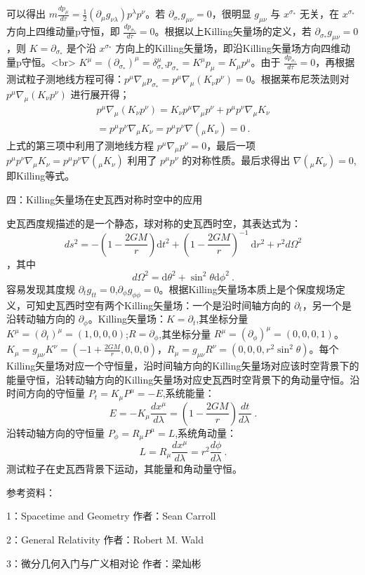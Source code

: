 可以得出 $m\frac{d p_{\mu}}{d \tau}=\frac{1}{2}\left(\partial_{\mu} g_{\nu \lambda}\right) p^{\lambda} p^{\nu}$。若 $\partial_{\sigma_{*}} g_{\mu \nu}=0$，很明显 $g_{\mu \nu}$ 与 $x^{\sigma_{*}}$ 无关，在 $x^{\sigma_{*}}$ 方向上四维动量p守恒，即 $\frac{d p_{\sigma_{*}}}{d \tau}=0$。根据以上Killing矢量场的定义，若 $\partial_{\sigma_{*}} g_{\mu \nu}=0$，则 $K=\partial_{\sigma_{*}}$ 是个沿 $x^{\sigma_{*}}$ 方向上的Killing矢量场，即沿Killing矢量场方向四维动量p守恒。<br>
$K^{\mu}=(\partial_{\sigma_{*}})^{\mu}=\delta_{\sigma_{*}}^{\mu}$,$p_{\sigma_{*}}=K^{\mu}p_{\mu}=K_{\mu}p^{\mu}$。由于 $\frac{d p_{\sigma_{*}}}{d \tau}=0$，再根据测试粒子测地线方程可得：$p^{\mu} \nabla_{\mu} p_{\sigma_{*}}=p^{\mu} \nabla_{\mu}(K_{\nu}p^{\nu}) =0$。根据莱布尼茨法则对 $p^{\mu} \nabla_{\mu}(K_{\nu}p^{\nu})$ 进行展开得；
$$\begin{aligned}
p^{\mu} \nabla_{\mu}(K_{\nu}p^{\nu})=K_{\nu}p^{\mu} \nabla_{\mu}p^{\nu}+p^{\mu} p^{\nu}\nabla_{\mu}K_{\nu}\\
=p^{\mu} p^{\nu}\nabla_{\mu}K_{\nu}=p^{\mu} p^{\nu}\nabla(_{\mu}K_{\nu})=0~.
\end{aligned}$$
上式的第三项中利用了测地线方程 $p^{\mu} \nabla_{\mu}p^{\nu}=0$，最后一项 $p^{\mu} p^{\nu}\nabla_{\mu}K_{\nu}=p^{\mu} p^{\nu}\nabla(_{\mu}K_{\nu})$ 利用了 $p^{\mu} p^{\nu}$ 的对称性质。最后求得出 $\nabla(_{\mu}K_{\nu})=0$,即Killing等式。

四：Killing矢量场在史瓦西对称时空中的应用

史瓦西度规描述的是一个静态，球对称的史瓦西时空，其表达式为：
$$d s^{2}=-\left(1-\frac{2 G M}{r}\right) \mathrm{d} t^{2}+\left(1-\frac{2 G M}{r}\right)^{-1} \mathrm{~d} r^{2}+r^{2} d \Omega^{2}$$，其中$$d \Omega^{2}=\mathrm{d} \theta^{2}+\sin ^{2} \theta \mathrm{d} \phi^{2}~.$$
容易发现其度规 $\partial_{t} g_{tt}=0$,$\partial_{\phi} g_{\phi\phi}=0$。根据Killing矢量场本质上是个保度规场定义，可知史瓦西时空有两个Killing矢量场：一个是沿时间轴方向的 $\partial_{t}$，另一个是沿转动轴方向的 $\partial_{\phi}$。Killing矢量场：$K=\partial_{t}$,其坐标分量 $K^{\mu}=\left(\partial_{t}\right)^{\mu}=(1,0,0,0)$;$R=\partial_{\phi}$,其坐标分量 $R^{\mu}=\left(\partial_{\phi}\right)^{\mu}=(0,0,0,1)$。$K_{\mu}=g_{\mu \nu}K^{\nu}=(-1+\frac{2 G M}{r},0,0,0)$，$R_{\mu}=g_{\mu \nu}R^{\nu}=(0,0,0,r^{2}\sin ^{2} \theta )$。每个Killing矢量场对应一个守恒量，沿时间轴方向的Killing矢量场对应该时空背景下的能量守恒，沿转动轴方向的Killing矢量场对应史瓦西时空背景下的角动量守恒。沿时间方向的守恒量 $P_{t}=K_{\mu}P^{\mu}=-E$,系统能量：$$E=-K_{\mu} \frac{d x^{\mu}}{d \lambda}=\left(1-\frac{2 G M}{r}\right) \frac{d t}{d \lambda~}~.$$
沿转动轴方向的守恒量 $P_{\phi}=R_{\mu}P^{\mu}=L$,系统角动量：$$L=R_{\mu} \frac{d x^{\mu}}{d \lambda}=r^{2} \frac{d \phi}{d \lambda}~.$$
测试粒子在史瓦西背景下运动，其能量和角动量守恒。

参考资料：

1：Spacetime and Geometry 作者：Sean Carroll

2：General Relativity   作者：Robert M. Wald

3：微分几何入门与广义相对论  作者：梁灿彬